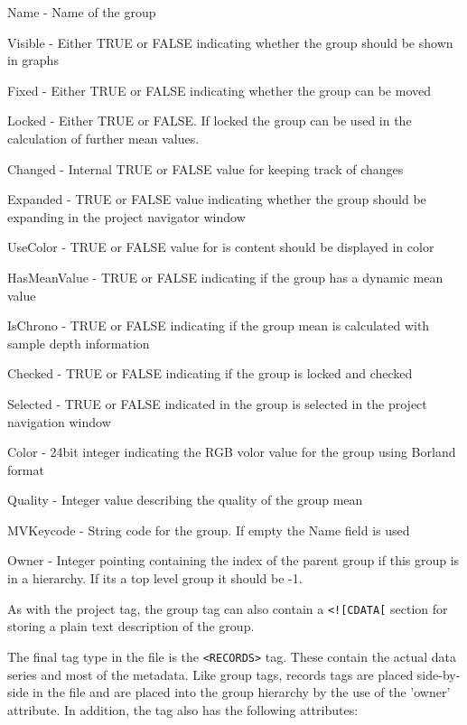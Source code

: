 \begin{itemize*}
    \item  Name - Name of the group
    \item  Visible - Either TRUE or FALSE indicating whether the group should be shown in graphs
    \item  Fixed - Either TRUE or FALSE indicating whether the group can be moved
    \item  Locked - Either TRUE or FALSE. If locked the group can be used in the calculation of further mean values.
    \item  Changed - Internal TRUE or FALSE value for keeping track of changes
    \item  Expanded - TRUE or FALSE value indicating whether the group should be expanding in the project navigator window
    \item  UseColor - TRUE or FALSE value for is content should be displayed in color
    \item  HasMeanValue - TRUE or FALSE indicating if the group has a dynamic mean value
    \item  IsChrono - TRUE or FALSE indicating if the group mean is calculated with sample depth information
    \item  Checked - TRUE or FALSE indicating if the group is locked and checked
    \item  Selected - TRUE or FALSE indicated in the group is selected in the project navigation window
    \item  Color - 24bit integer indicating the RGB volor value for the group using Borland format
    \item  Quality - Integer value describing the quality of the group mean
    \item  MVKeycode - String code for the group. If empty the Name field is used
    \item  Owner - Integer pointing containing the index of the parent group if this group is in a hierarchy. If its a top level group it should be -1. 
\end{itemize*}

As with the project tag, the group tag can also contain a \verb|<![CDATA[| section for storing a plain text description of the group.

The final tag type in the file is the \verb|<RECORDS>| tag. These contain the actual data series and most of the metadata. Like group tags, records tags are placed side-by-side in the file and are placed into the group hierarchy by the use of the 'owner' attribute. In addition, the tag also has the following attributes:

